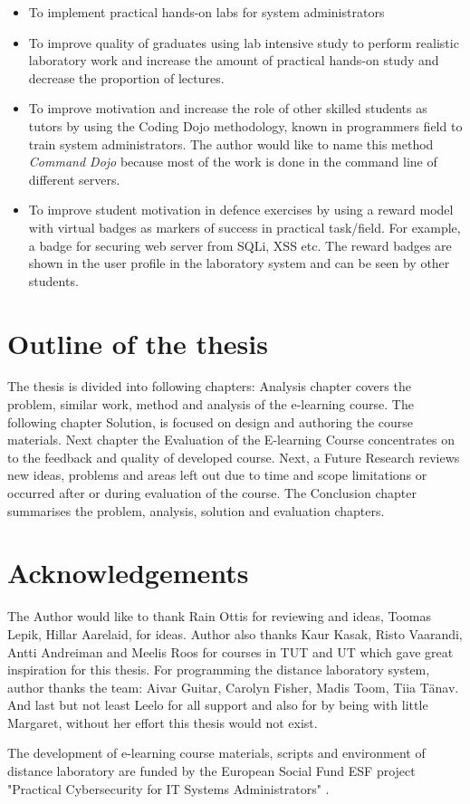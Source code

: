 

\begin{itemize}
\item To implement practical hands-on labs for system administrators
\item To improve quality of graduates using lab intensive study  to perform realistic laboratory work and increase the amount of practical hands-on study and decrease the proportion of lectures.
\item To improve motivation and increase the role of other skilled students as tutors by  using the \gls{Coding Dojo} methodology, known in programmers field to train system administrators. The author would like to name this method  \emph{Command Dojo} because most of the work is done in the command line of different servers.
\item To improve student motivation in defence exercises by using a reward model with virtual badges as markers of success in practical task/field. For example, a badge for securing web server from \gls{SQLi}, \gls{XSS} etc. The reward badges are shown in the user profile in the laboratory system and can be seen by other students.
\end{itemize}
\par


\section{Outline of the thesis}
The thesis is divided into following chapters: Analysis chapter covers the problem, similar work, method and analysis of the e-learning course. The following chapter Solution, is focused on design and authoring the course materials. Next chapter the Evaluation of the E-learning Course concentrates on to the feedback and quality of developed course. Next, a Future Research reviews new ideas, problems and areas left out due to time and scope limitations or occurred after or during evaluation of the course. The Conclusion chapter summarises the problem, analysis, solution and evaluation chapters.



\section{Acknowledgements}
The Author would like to thank Rain Ottis for reviewing and ideas, Toomas Lepik, Hillar Aarelaid, for ideas. Author also thanks Kaur Kasak, Risto Vaarandi, Antti Andreiman and Meelis Roos for courses in TUT and UT which gave great inspiration for this thesis. For programming the distance laboratory system, author thanks the team: Aivar Guitar, Carolyn Fisher, Madis Toom, Tiia Tänav. And last but not least Leelo for all support and also for by being with little Margaret, without her effort this thesis would not exist.

The development of e-learning course materials, scripts and environment of distance laboratory are funded by the European Social Fund \gls{ESF} project "Practical Cybersecurity for IT Systems Administrators" \citep{website:ESF_project}.

